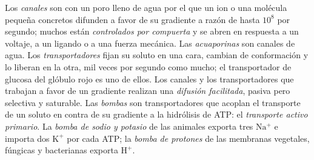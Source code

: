 \begin{definition}\label{def:b1:membranes-transport:transporters}
Los \emph{canales} son  con un poro lleno
de agua por el que un ion o una molécula pequeña concretos difunden a favor
de su gradiente a razón de hasta $10^8$ por segundo; muchos están
\emph{controlados por compuerta} y se abren en respuesta a un voltaje, a un
ligando o a una fuerza mecánica. Las \emph{acuaporinas}
son canales de agua. Los \emph{transportadores} fijan
su soluto en una cara, cambian de conformación y lo liberan en la otra, mil
veces por segundo como mucho; el transportador de glucosa del glóbulo rojo
es uno de ellos. Los canales y los transportadores que trabajan a favor de
un gradiente realizan una \emph{difusión facilitada}, pasiva pero selectiva y saturable. Las
\emph{bombas} son transportadores que acoplan el transporte de
un soluto en contra de su gradiente a la hidrólisis de ATP: el
\emph{transporte activo primario}. La \emph{bomba
de sodio y potasio} de las  animales
exporta tres $\mathrm{Na^+}$ e importa dos $\mathrm{K^+}$ por cada ATP; la
\emph{bomba de protones} de las membranas vegetales, fúngicas y bacterianas
exporta $\mathrm{H^+}$.
\end{definition}

